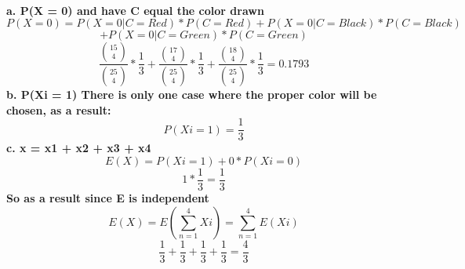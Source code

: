 \documentclass{article}
\begin{document}
\paragraph{
a. P(X = 0) and have C equal the color drawn
$$P(X = 0) = P(X = 0 | C = Red)*P(C = Red) + P(X = 0 | C = Black) * P(C = Black)$$$$+ P(X = 0 | C = Green) * P(C = Green)$$
$$\frac{{15 \choose 4}}{{25 \choose 4}} * \frac{1}{3} + \frac{{17 \choose 4}}{{25 \choose 4}} * \frac{1}{3} + \frac{{18 \choose 4}}{{25 \choose 4}} * \frac{1}{3} = 0.1793$$
b. P(Xi = 1)
There is only one case where the proper color will be chosen, as a result:
$$P(Xi = 1) = \frac{1}{3}$$
c. x = x1 + x2 + x3 + x4\newline
$$E(X) = P(Xi = 1) + 0 * P(Xi = 0)$$
$$1 * \frac{1}{3} = \frac{1}{3}$$
So as a result since E is independent
$$E(X) = E(\sum_{n=1}^{4} Xi) = \sum_{n=1}^{4} E(Xi)$$
$$\frac{1}{3} + \frac{1}{3} + \frac{1}{3} + \frac{1}{3} = \frac{4}{3}$$
}
\end{document}

